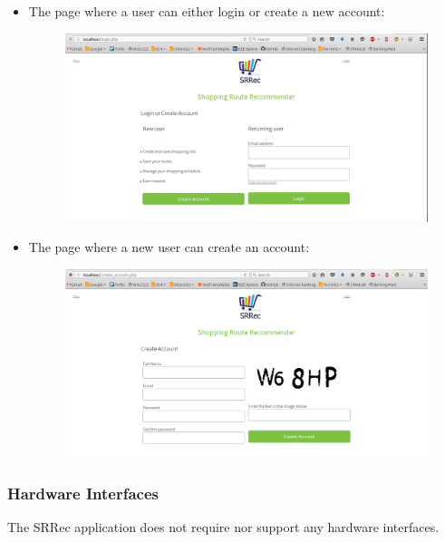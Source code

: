\documentclass[10pt, a4paper, onecolumn]{scrartcl}
\begin{document}
\begin{itemize}
					\newpage
					\item The page where a user can either login or create a new account:
					\begin{figure}[h!]
						\centering
						\includegraphics[width = \textwidth]{../images/login_new.png}
						\label{login page}
					\end{figure}
					
					
					\item The page where a new user can create an account:
					\begin{figure}[h!]
						\centering
						\includegraphics[width = \textwidth]{../images/create_account_new.png}
						\label{create account page}
					\end{figure}
													
				\end{itemize}
		
		\subsubsection{Hardware Interfaces}
		
			The SRRec application does not require nor support any hardware interfaces.
		
\end{document}
